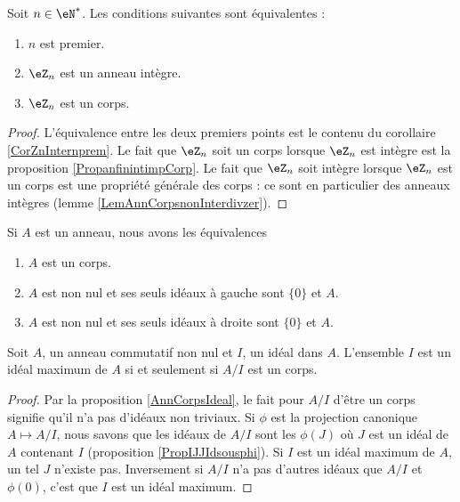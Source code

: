 \begin{proposition}     \label{PropzhFgNJ}
    Soit \( n\in\eN^*\). Les conditions suivantes sont équivalentes :
    \begin{enumerate}
        \item
            \( n\) est premier.
        \item
            \( \eZ_n\) est un anneau intègre.
        \item
            \( \eZ_n\) est un corps.
    \end{enumerate}
\end{proposition}

\begin{proof}
    L'équivalence entre les deux premiers points est le contenu du corollaire \ref{CorZnInternprem}. Le fait que \( \eZ_n\) soit un corps lorsque \( \eZ_n\) est intègre est la proposition \ref{PropanfinintimpCorp}. Le fait que \( \eZ_n\) soit intègre lorsque \( \eZ_n\) est un corps est une propriété générale des corps : ce sont en particulier des anneaux intègres (lemme \ref{LemAnnCorpsnonInterdivzer}).
\end{proof}

\begin{proposition}     \label{AnnCorpsIdeal}
    Si \( A\) est un anneau, nous avons les équivalences
    \begin{enumerate}
        \item
            \( A\) est un corps.
        \item
            \( A\) est non nul et ses seuls idéaux à gauche sont \( \{ 0 \}\) et \( A\).
        \item
            \( A\) est non nul et ses seuls idéaux à droite sont \( \{ 0 \}\) et \( A\).
    \end{enumerate}
\end{proposition}

\begin{proposition}
    Soit \( A\), un anneau commutatif non nul et \( I\), un idéal dans \( A\). L'ensemble \( I\) est un idéal maximum de \( A\) si et seulement si \( A/I\) est un corps.
\end{proposition}

\begin{proof}
    Par la proposition \ref{AnnCorpsIdeal}, le fait pour \( A/I\) d'être un corps signifie qu'il n'a pas d'idéaux non triviaux. Si \( \phi\) est la projection canonique \( A\mapsto A/I\), nous savons que les idéaux de \( A/I\) sont les \( \phi(J)\) où \( J\) est un idéal de \( A\) contenant \( I\) (proposition \ref{PropIJJIdsousphi}). Si \( I\) est un idéal maximum de \( A\), un tel \( J\) n'existe pas. Inversement si \( A/I\) n'a pas d'autres idéaux que \( A/I\) et \( \phi(0)\), c'est que \( I\) est un idéal maximum.
\end{proof}

